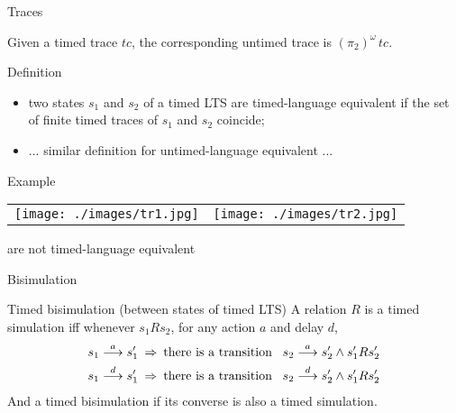 \documentclass{beamer}
\def\dgold#1{{\darkgoldenrod #1}}
\def\dkb#1{{\blue #1}}
\begin{document}
\begin{slide}{Traces}
\small

Given a \dgold{timed trace} $tc$, the corresponding \dkb{untimed trace} is $(\pi_2)^{\omega}\,  tc$.

\begin{block}{Definition}
\begin{itemize}
\item two states $s_1$ and $s_2$ of a timed LTS are \dkb{timed-language equivalent} if the \dgold{set of finite timed traces}
of  $s_1$ and $s_2$ coincide;
\item ... similar definition for \dkb{untimed-language equivalent} ...
\end{itemize}
\end{block}

\begin{exampleblock}{Example}
\begin{tabular}{cc}
 \texttt{[image: ./images/tr1.jpg]} &   %
  \texttt{[image: ./images/tr2.jpg]}
\end{tabular}
are not \dkb{timed-language equivalent}
\\
\end{exampleblock}
\end{slide}

\begin{slide}{Bisimulation}
\small

\begin{block}{Timed bisimulation (between states of timed LTS)}
A relation $R$ is a \dkb{timed simulation} iff whenever $s_1 R s_2$, for any action $a$ and delay $d$,
\begin{align*}
s_1\stackrel{a}{\longrightarrow} s_1'\; & \mathbin{\Rightarrow}\; \text{there is a transition}\; \; \; s_2 \stackrel{a}{\longrightarrow} s_2' \mathbin{\wedge} s_1' R s_2'\\
s_1 \stackrel{d}{\longrightarrow} s_1'\; & \mathbin{\Rightarrow}\; \text{there is a transition}\; \; \; s_2 \stackrel{d}{\longrightarrow} s_2' \mathbin{\wedge} s_1' R s_2'
\end{align*}
And a \dkb{timed bisimulation} if its converse is also a timed simulation.
\end{block}
\end{slide}
\end{document}
